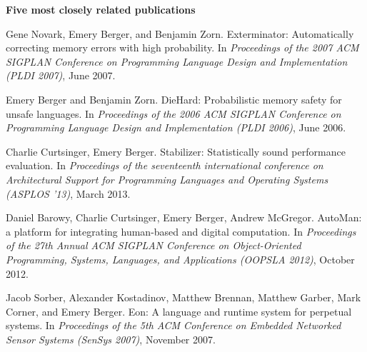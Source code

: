 \documentclass[11pt]{article}
\begin{document}
\begin{description}
\setlength{\labelsep}{0ex}
\setlength{\itemsep}{-0.5ex}

\item {\bf\textsf {Five most closely related publications}}


\item Gene Novark, Emery Berger, and Benjamin Zorn. Exterminator: Automatically correcting memory errors with high probability. In {\em Proceedings of the 2007 {ACM} {SIGPLAN} Conference on Programming Language Design and Implementation ({PLDI} 2007)}, June 2007.

\item Emery Berger and Benjamin Zorn. DieHard: Probabilistic memory safety for unsafe languages. In {\em Proceedings of the 2006 {ACM} {SIGPLAN} Conference on Programming Language Design and Implementation ({PLDI} 2006)}, June 2006.

\item Charlie Curtsinger, Emery Berger. {\sc Stabilizer}: Statistically sound performance evaluation. In {\em Proceedings of the seventeenth international conference on Architectural Support for Programming Languages and Operating Systems ({ASPLOS '13})}, March 2013.

\item Daniel Barowy, Charlie Curtsinger, Emery Berger, Andrew McGregor. {\sc AutoMan}: a platform for integrating human-based and digital computation. In {\em Proceedings of the 27th Annual ACM SIGPLAN Conference on Object-Oriented Programming, Systems, Languages, and Applications ({OOPSLA} 2012)}, October 2012.

\item Jacob Sorber, Alexander Kostadinov, Matthew Brennan, Matthew Garber, Mark Corner, and Emery Berger. Eon: A language and runtime system for perpetual systems. In {\em Proceedings of the 5th {ACM} Conference on Embedded Networked Sensor Systems ({SenSys} 2007)}, November 2007.



\end{description}
\end{document}
